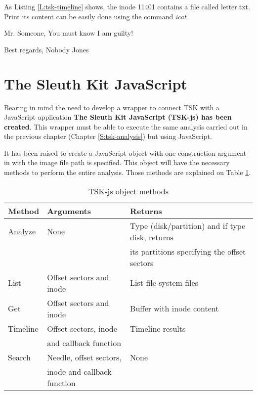 As Listing \ref{L:tsk-timeline} shows, the inode 11401 contains a file called
letter.txt. Print its content can be easily done using the command
\textit{icat}. 


\begin{terminal}[caption=Export a file contained inside the file system,label=L:icat-export]
%
%
Mr. Someone,
You must know I am guilty!

Best regards,
Nobody Jones

\end{terminal}


\section{The Sleuth Kit JavaScript}


Bearing in mind the need to develop a wrapper to connect TSK with a JavaScript
application \textbf{The Sleuth Kit JavaScript (TSK-js) has been created}. This
wrapper must be able to execute the same analysis carried out in the previous chapter
(Chapter \ref{S:tsk-analysis}) but using JavaScript.

It has been raised to create a JavaScript object with one construction argument
in with the image file path is specified. This object will have the necessary
methods to perform the entire analysis. Those methods are explained on Table
\ref{T:tsk-js-object-methods}.

\begin{table}[htb]
\begin{center}
\begin{tabular}{|l|l|l|}
\hline
{\bf Method }	& {\bf Arguments} & {\bf Returns } \\ \hline \hline
Analyze	& None & Type (disk/partition) and if type disk, returns\\
& 	   & its partitions specifying the offset sectors \\ \hline
List & Offset sectors and inode & List file system files \\ \hline
Get & Offset sectors and inode & Buffer with inode content \\ \hline
Timeline & Offset sectors, inode & Timeline results \\ 
& and callback function & \\ \hline
Search & Needle, offset sectors, & None \\ 
& inode and callback function & \\ \hline
\end{tabular}
\caption{TSK-js object methods}
\label{T:tsk-js-object-methods}
\end{center}
\end{table}

